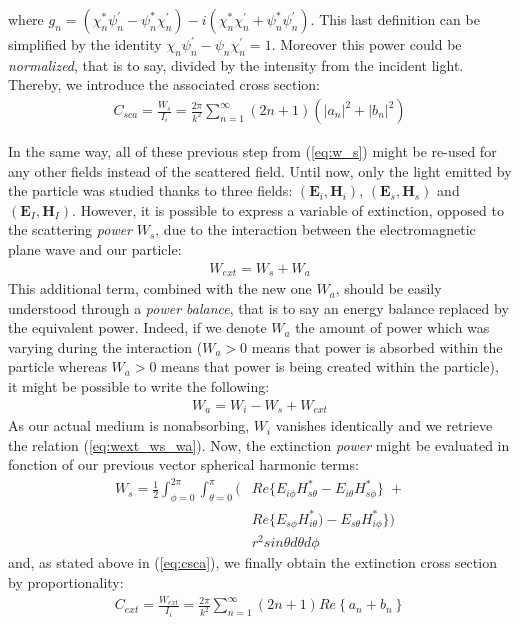 \documentclass{article}
\numberwithin{equation}{section}
\begin{document}
where $g_{n}=(\chi^{*}_{n}\psi^{'}_{n}-\psi^{*}_{n}\chi^{'}_{n})-i(\chi^{*}_{n}\chi^{'}_{n}+\psi^{*}_{n}\psi^{'}_{n})$. This last definition can be simplified by the identity $\chi_{n}\psi^{'}_{n}-\psi_{n}\chi^{'}_{n}=1$. Moreover this power could be \textit{normalized}, that is to say, divided by the intensity from the incident light. Thereby, we introduce the associated cross section:
\begin{align}\label{eq:csca}
C_{sca}=\frac{W_{s}}{I_{i}}=\frac{2\pi}{k^{2}}\sum_{n=1}^{\infty }(2n+1)(\left| a_{n} \right|^{2}+\left| b_{n} \right|^{2})
\end{align}

In the same way, all of these previous step from (\ref{eq:w_s}) might be re-used for any other fields instead of the scattered field. Until now, only the light emitted by the particle was studied thanks to three fields: $(\textbf{E}_{i}, \textbf{H}_{i})$, $(\textbf{E}_{s}, \textbf{H}_{s})$ and $(\textbf{E}_{I}, \textbf{H}_{I})$. However, it is possible to express a variable of extinction, opposed to the scattering \textit{power} $W_{s}$, due to the interaction between the electromagnetic plane wave and our particle:
\begin{align}\label{eq:wext_ws_wa}
W_{ext} = W_{s} + W_{a}
\end{align}
This additional term, combined with the new one $W_{a}$, should be easily understood through a \textit{power balance}, that is to say an energy balance replaced by the equivalent power. Indeed, if we denote $W_{a}$ the amount of power which was varying during the interaction ($W_{a} > 0$ means that power is absorbed within the particle whereas $W_{a} > 0$ means that power is being created within the particle), it might be possible to write the following:
\begin{align}
W_{a} = W_{i} - W_{s} + W_{ext}
\end{align}
As our actual medium is nonabsorbing, $W_{i}$ vanishes identically and we retrieve the relation (\ref{eq:wext_ws_wa}). Now, the extinction \textit{power} might be evaluated in fonction of our previous vector spherical harmonic terms:
\begin{equation}
\begin{aligned}
W_{s}=\frac{1}{2}\int_{\phi=0}^{2\pi}\int_{\theta=0}^{\pi} (&Re\{E_{i\phi}H^{*}_{s\theta} - E_{i\theta}H^{*}_{s\phi}\}\; +\\
&Re\{E_{s\phi}H^{*}_{i\theta}) - E_{s\theta}H^{*}_{i\phi}\}) \\
&r^{2}sin\theta d\theta d\phi
\end{aligned}
\end{equation}
and, as stated above in (\ref{eq:csca}), we finally obtain the extinction cross section by proportionality:
\begin{align}\label{eq:cext}
C_{ext}=\frac{W_{ext}}{I_{i}}=\frac{2\pi}{k^{2}}\sum_{n=1}^{\infty }(2n+1)Re\left\{a_{n} + b_{n} \right\}
\end{align}
\end{document}
